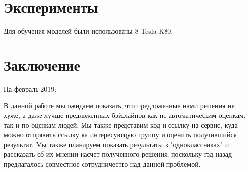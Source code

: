 \documentclass[aps,%
12pt,%
final,%
oneside,
onecolumn,%
musixtex, %
superscriptaddress,%
centertags]{article} %
\begin{document}
\section{Эксперименты}
Для обучения моделей были использованы 8 Tesla K80.

\section{Заключение}
На февраль 2019:

В данной работе мы ожидаем показать, что предложенные нами решения не хуже,
а даже лучше предложенных бэйзлайнов как по автоматическим оценкам, так и по оценкам
людей. Мы также представим код и ссылку на сервис, куда можно отправить ссылку на
интересующую группу и оценить получившийся результат. Мы также планируем показать
результаты в "одноклассниках" и рассказать об их мнении насчет полученного решения,
поскольку год назад предлагалось совместное сотрудничество над данной проблемой.



\end{document}
